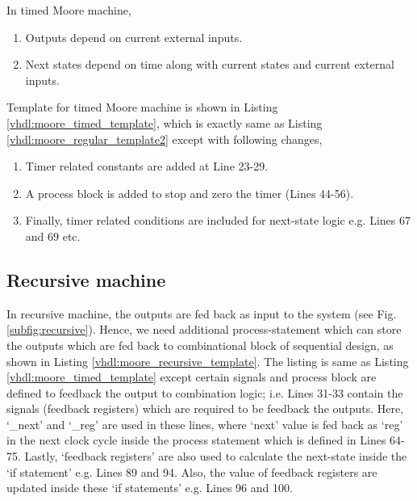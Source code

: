 \begin{noNumBox}
	In timed Moore machine, 
	\begin{enumerate}
		\item Outputs depend on current external inputs. 
		\item Next states depend on time along with current states and current external inputs.
	\end{enumerate}
\end{noNumBox}
Template for timed Moore machine is shown in Listing \ref{vhdl:moore_timed_template}, which is exactly same as Listing \ref{vhdl:moore_regular_template2} except with following changes, 
\begin{enumerate}
	\item Timer related constants are added at Line 23-29.
	\item A process block is added to stop and zero the timer (Lines 44-56). 
	\item Finally, timer related conditions are included for next-state logic e.g.  Lines 67 and 69 etc.
\end{enumerate}





\subsection{Recursive machine}
In recursive machine, the outputs are fed back as input to the system (see Fig. \ref{subfig:recursive}). Hence, we need additional process-statement which can store the outputs which are fed back to combinational block of sequential design, as shown in Listing \ref{vhdl:moore_recursive_template}. The listing is same as Listing \ref{vhdl:moore_timed_template} except certain signals and process block are defined to feedback the output to combination logic; i.e. Lines 31-33 contain the signals (feedback registers) which are required to be feedback the outputs. Here, `\_next' and `\_reg' are used in these lines, where `next' value is fed back as `reg' in the next clock cycle inside the process statement which is defined in Lines 64-75. Lastly, `feedback registers' are also used to calculate the next-state inside the `if statement' e.g. Lines 89 and 94. Also, the value of feedback registers are updated inside these `if statements' e.g. Lines 96 and 100. 

